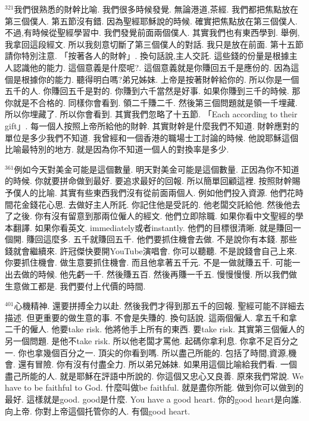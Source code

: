 \documentclass{book}
\begin{document}
$^{321}$我們很熟悉的財幹比喻.
我們很多時候發覺.
無論港道,茶經.
我們都把焦點放在第三個僕人.
第五節沒有錯.
因為聖經耶穌說的時候.
確實把焦點放在第三個僕人.
不過,有時候從聖經學習中.
我們發覺前面兩個僕人.
其實我們也有東西學到.
舉例,我拿回這段經文.
所以我刻意切斷了第三個僕人的對話.
我只是放在前面.
第十五節請你特別注意.
「按著各人的財幹」.
換句話說,主人交託.
這些錢的份量是根據主人認識他的能力.
這個意義是什麼呢?.
這個意義就是你賺回五千是應份的.
因為這個是根據你的能力.
聽得明白嗎?弟兄姊妹.
上帝是按著財幹給你的.
所以你是一個五千的人.
你賺回五千是對的.
你賺到六千當然是好事.
如果你賺到三千的時候.
那你就是不合格的.
同樣你會看到.
領二千賺二千.
然後第三個問題就是領一千埋藏.
所以你埋藏了.
所以你會看到.
其實我們忽略了十五節.
「Each according to their gift」.
每一個人按照上帝所給他的財幹.
其實財幹是什麼我們不知道.
財幹應對的單位是多少我們不知道.
我曾經和一個香港的職場士工討論的時候.
他說耶穌這個比喻最特別的地方.
就是因為你不知道一個人的對換率是多少.

$^{361}$例如今天對美金可能是這個數量.
明天對美金可能是這個數量.
正因為你不知道的時候.
你就要拼命做到最好.
要追求最好的回報.
所以簡單回顧這裡.
按照財幹賜予僕人的比喻.
其實有些東西我們沒有從前面兩個人.
例如他們投入資源.
他們花時間花金錢花心思.
去做好主人所託.
你記住他是受託的.
他老闆交託給他.
然後他去了之後.
你有沒有留意到那兩位僱人的經文.
他們立即除職.
如果你看中文聖經的學本翻譯.
如果你看英文.
immediately或者instantly.
他們的目標很清晰.
就是賺回一個開.
賺回這麼多.
五千就賺回五千.
他們要抓住機會去做.
不是說你有本錢.
那些錢就會繼續來.
許冠傑快要開YouTube演唱會.
你可以聽聽.
不是說錢會自己上來.
你要抓住機會.
做生意要抓住機會.
而且他拿著五千元.
不是一做就賺五千.
可能一出去做的時候.
他先虧一千.
然後賺五百.
然後再賺一千五.
慢慢慢慢.
所以我們做生意做工都是.
我們要付上代價的時間.

$^{401}$心機精神.
還要拼搏全力以赴.
然後我們才得到那五千的回報.
聖經可能不詳細去描述.
但更重要的做生意的事.
不會是失賺的.
換句話說.
這兩個僱人.
拿五千和拿二千的僱人.
他要take risk.
他將他手上所有的東西.
要take risk.
其實第三個僱人的另一個問題.
是他不take risk.
所以他老闆才罵他.
起碼你拿利息.
你拿不足百分之一.
你也拿幾個百分之一.
頂尖的你看到嗎.
所以盡己所能的.
包括了時間,資源,機會.
還有冒險.
你有沒有付盡全力.
所以弟兄姊妹.
如果用這個比喻給我們看.
一個盡己所能的人.
就是耶穌在評語中所說的.
你這個又忠心又良善.
原來我們常說.
We have to be faithful to God.
什麼叫做be faithful.
就是盡你所能.
做到你可以做到的最好.
這樣就是good.
good是什麼.
You have a good heart.
你的good heart是向誰.
向上帝.
你對上帝這個托管你的人.
有個good heart.
\end{document}

